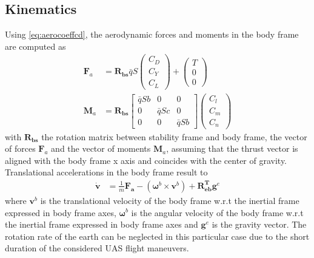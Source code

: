 \documentclass{ifacconf}
\newcommand{\mbf}[1]{\mathbf{#1}}
\providecommand{\mbf}[1]{\mathbf{#1}}
\newcommand{\Rbs}{{\ensuremath{\mbf{R_{b   s}}}}}
\newcommand{\Rbe}{{\ensuremath{\mbf{R^T_{e  b}}}}}
\newcommand{\qbar}{\ensuremath{\bar{q}}}
\begin{document}
\subsection{Kinematics}
Using \ref{eq:aerocoeffcd}, the aerodynamic forces and moments in the body frame are computed as
\begin{align}
\label{eq:coeff2realforcesandmoments}
\mathbf{F}_a
&=
\Rbs
\bar{q}
S
\begin{pmatrix}
C_D \\ 
C_Y \\
C_L 
\end{pmatrix}
+
\begin{pmatrix}
T \\ 
0 \\
0 
\end{pmatrix}\\
\mathbf{M}_a
&=
\Rbs
\begin{bmatrix}
\qbar S b & 0 & 0 \\
0 & \qbar S c & 0 \\
0& 0 & \qbar S b 
\end{bmatrix}
\begin{pmatrix}
C_l \\ 
C_m \\
C_n 
\end{pmatrix}
\end{align}
with $\Rbs$ the rotation matrix between stability frame and body frame, the vector of forces $\mathbf{F}_a$ and the vector of moments $\mathbf{M}_a$, assuming that the thrust vector is aligned with the body frame x axis and coincides with the center of gravity.
Translational accelerations in the body frame result to
\begin{align}
\label{eq:forces2accelerations}
\dot{\mathbf{v}} &= \frac{1}{m}\mathbf{F_a} 
- (\mathbf{\omega}^b \times \mathbf{v}^b) 
+
\Rbe
\mathbf{g}^e
\end{align}
where $\mathbf{v}^b$ is the translational velocity of the body frame w.r.t the inertial frame expressed in body frame axes, 
$\mathbf{\omega}^{b}$ is the angular velocity of the body frame w.r.t the inertial frame expressed in body frame axes and $\mathbf{g}^e$ is the gravity vector. The rotation rate of the earth can be neglected in this particular case due to the short duration of the considered UAS flight maneuvers.\\
\end{document}
